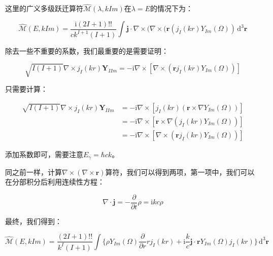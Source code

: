这里的广义多级跃迁算符$\hat{\mathcal{M}}(\lambda,kIm)$在$\lambda=E$的情况下为：

\begin{equation}
\hat{\mathcal{M}}(E,kIm)=\frac{\mathrm{i}(2I+1)!!}{ck^{I+1}(I+1)}\int\boldsymbol{j}\cdot\nabla\times(\nabla\times(\boldsymbol{r}(j_{I}(kr)Y_{Im}(\Omega))\,\mathrm{d}^{3}\boldsymbol{r}
\end{equation}

\begin{booknote*}
除去一些不重要的系数，我们最重要的是需要证明：

\[
\sqrt{I(I+1)}\nabla\times j_{I}(kr)\boldsymbol{Y}_{IIm}=-\mathrm{i}\nabla\times\left[\nabla\times\left(\boldsymbol{r}j_{I}(kr)Y_{Im}(\Omega)\right)\right]
\]

只需要计算：

\begin{align*}
\sqrt{I(I+1)}\nabla\times j_{I}(kr)\boldsymbol{Y}_{IIm} & =-\mathrm{i}\nabla\times\left[j_{I}(kr)\left(\boldsymbol{r}\times\nabla Y_{Im}(\Omega)\right)\right]\\
 & =-\mathrm{i}\nabla\times\left[\boldsymbol{r}\times\nabla\left(j_{I}(kr)Y_{Im}(\Omega)\right)\right]\\
 & =-\mathrm{i}\nabla\times\left[\nabla\times\left(\boldsymbol{r}j_{I}(kr)Y_{Im}(\Omega)\right)\right]
\end{align*}

添加系数即可，需要注意$E_{\gamma}=\hbar ck$。
\end{booknote*}
同之前一样，计算$\nabla\times(\nabla\times\boldsymbol{r})$算符，我们可以得到两项，第一项中，我们可以在分部积分后利用连续性方程：

\begin{equation}
\nabla\cdot\boldsymbol{j}=-\frac{\partial}{\partial t}\rho=\mathrm{i}kc\rho
\end{equation}

最终，我们得到：

\begin{equation}
\hat{\mathcal{M}}(E,kIm)=\frac{(2I+1)!!}{k^{I}(I+1)}\int\biggl\{\rho Y_{Im}(\Omega)\frac{\partial}{\partial r}rj_{I}(kr)+\mathrm{i}\frac{k}{c}\boldsymbol{j}\cdot\boldsymbol{r}Y_{Im}(\Omega)j_{I}(kr)\biggr\}\,\mathrm{d}^{3}\boldsymbol{r}
\end{equation}

